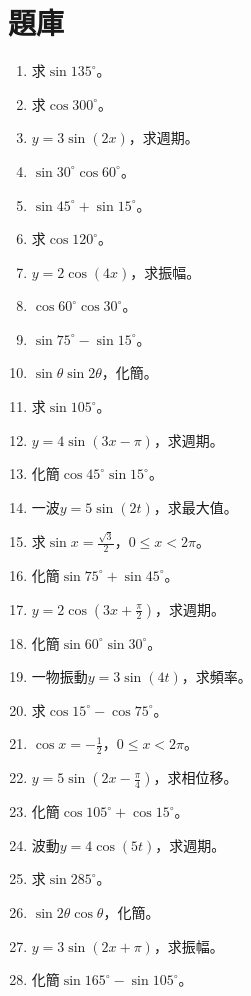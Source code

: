 \section{題庫}
\begin{enumerate}[label=\arabic*.]
    \item 求$\sin 135^\circ$。
    \item 求$\cos 300^\circ$。
    \item $y = 3 \sin(2x)$，求週期。
    \item $\sin 30^\circ \cos 60^\circ$。
    \item $\sin 45^\circ + \sin 15^\circ$。
    \item 求$\cos 120^\circ$。
    \item $y = 2 \cos(4x)$，求振幅。
    \item $\cos 60^\circ \cos 30^\circ$。
    \item $\sin 75^\circ - \sin 15^\circ$。
    \item $\sin \theta \sin 2\theta$，化簡。
    \item 求$\sin 105^\circ$。
    \item $y = 4 \sin(3x - \pi)$，求週期。
    \item 化簡$\cos 45^\circ \sin 15^\circ$。
    \item 一波$y = 5 \sin(2t)$，求最大值。
    \item 求$\sin x = \frac{\sqrt{3}}{2}$，$0 \leq x < 2\pi$。
    \item 化簡$\sin 75^\circ + \sin 45^\circ$。
    \item $y = 2 \cos(3x + \frac{\pi}{2})$，求週期。
    \item 化簡$\sin 60^\circ \sin 30^\circ$。
    \item 一物振動$y = 3 \sin(4t)$，求頻率。
    \item 求$\cos 15^\circ - \cos 75^\circ$。
    \item $\cos x = -\frac{1}{2}$，$0 \leq x < 2\pi$。
    \item $y = 5 \sin(2x - \frac{\pi}{4})$，求相位移。
    \item 化簡$\cos 105^\circ + \cos 15^\circ$。
    \item 波動$y = 4 \cos(5t)$，求週期。
    \item 求$\sin 285^\circ$。
    \item $\sin 2\theta \cos \theta$，化簡。
    \item $y = 3 \sin(2x + \pi)$，求振幅。
    \item 化簡$\sin 165^\circ - \sin 105^\circ$。

\end{enumerate}
